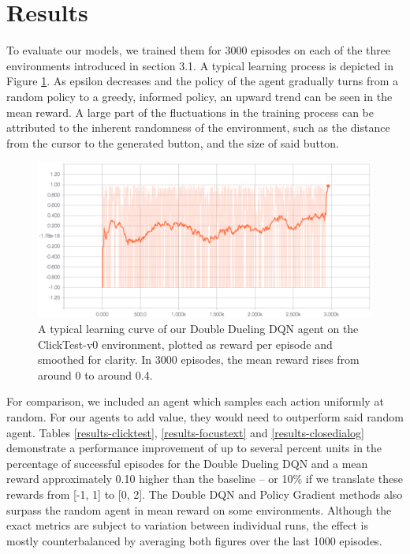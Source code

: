 \documentclass[10pt,journal,compsoc]{IEEEtran}
\begin{document}
\section{Results}

To evaluate our models, we trained them for 3000 episodes on each of the three environments introduced in section 3.1. A typical learning process is depicted in Figure \ref{fig:tboard}. As epsilon decreases and the policy of the agent gradually turns from a random policy to a greedy, informed policy, an upward trend can be seen in the mean reward. A large part of the fluctuations in the training process can be attributed to the inherent randomness of the environment, such as the distance from the cursor to the generated button, and the size of said button.

\begin{figure}[t!]
\centering
	\includegraphics[width=\columnwidth, keepaspectratio]{learningcurve.png}
	\caption{A typical learning curve of our Double Dueling DQN agent on the ClickTest-v0 environment, plotted as reward per episode and smoothed for clarity. In 3000 episodes, the mean reward rises from around 0 to around 0.4.}
	\label{fig:tboard}
\end{figure}

For comparison, we included an agent which samples each action uniformly at random. For our agents to add value, they would need to outperform said random agent. Tables \ref{results-clicktest}, \ref{results-focustext} and \ref{results-closedialog} demonstrate a performance improvement of up to several percent units in the percentage of successful episodes for the Double Dueling DQN and a mean reward approximately 0.10 higher than the baseline -- or 10\% if we translate these rewards from [-1, 1] to [0, 2]. The Double DQN and Policy Gradient methods also surpass the random agent in mean reward on some environments. Although the exact metrics are subject to variation between individual runs, the effect is mostly counterbalanced by averaging both figures over the last 1000 episodes.
\end{document}
